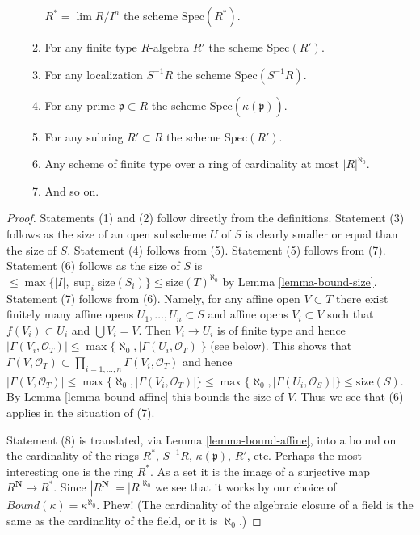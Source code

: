 \begin{lemma}
\begin{enumerate}
\begin{enumerate}
$R^* = \lim R/I^n$ the scheme $\text{Spec}(R^*)$.
\item For any finite type $R$-algebra $R'$ the
scheme $\text{Spec}(R')$.
\item For any localization $S^{-1}R$ the scheme $\text{Spec}(S^{-1}R)$.
\item For any prime $\mathfrak p \subset R$ the scheme
$\text{Spec}(\overline{\kappa(\mathfrak p)})$.
\item For any subring $R' \subset R$ the scheme
$\text{Spec}(R')$.
\item Any scheme of finite type over a ring of cardinality at most
$|R|^{\aleph_0}$.
\item And so on.
\end{enumerate}
\end{enumerate}
\end{lemma}

\begin{proof}
Statements (1) and (2) follow directly from the definitions.
Statement (3) follows as the size of an open subscheme $U$ of $S$ is 
clearly smaller or equal than the size of $S$.
Statement (4) follows from (5).
Statement (5) follows from (7).
Statement (6) follows as the size of $S$ is
$\leq \max\{|I|, \sup_i \text{size}(S_i)\} \leq \text{size}(T)^{\aleph_0}$
by Lemma \ref{lemma-bound-size}. Statement (7) follows from (6).
Namely, for any affine open $V \subset T$ there exist finitely many affine
opens $U_1, \ldots, U_n \subset S$ and affine opens $V_i \subset V$
such that $f(V_i) \subset U_i$ and $\bigcup V_i = V$.
Then $V_i \to U_i$ is of finite type and hence
$|\Gamma(V_i, \mathcal{O}_T)|
\leq \max\{\aleph_0, |\Gamma(U_i, \mathcal{O}_T)|\}$ (see below).
This shows that
$\Gamma(V, \mathcal{O}_T)
\subset \prod_{i = 1, \ldots , n} \Gamma(V_i, \mathcal{O}_T)$
and hence $|\Gamma(V, \mathcal{O}_T)| \leq
\max\{\aleph_0, |\Gamma(V_i, \mathcal{O}_T)|\}
\leq \max\{\aleph_0, |\Gamma(U_i, \mathcal{O}_S)|\} \leq \text{size}(S)$.
By Lemma \ref{lemma-bound-affine} this bounds the size
of $V$. Thus we see that (6) applies in the situation of (7).

\medskip\noindent
Statement (8) is translated, via Lemma \ref{lemma-bound-affine},
into a bound on the cardinality of the rings
$R^*$, $S^{-1}R$, $\overline{\kappa(\mathfrak p)}$, $R'$, etc.
Perhaps the most interesting one is the ring $R^*$. As a
set it is the image of a surjective map $R^{\mathbf{N}} \to R^*$.
Since $|R^{\mathbf{N}}| = |R|^{\aleph_0}$ we see that
it works by our choice of $Bound(\kappa) = \kappa^{\aleph_0}$.
Phew! (The cardinality of the algebraic closure of a field
is the same as the cardinality of the field, or it is $\aleph_0$.)
\end{proof}

